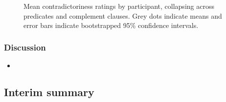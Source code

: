 \documentclass[11pt,fleqn]{article}
\newcommand{\6}{\mbox{$[\hspace*{-.6mm}[$}}
\newcommand{\9}{\mbox{$]\hspace*{-.6mm}]$}}
\begin{document}
\begin{figure}[h!]
\centering



\caption{Mean contradictoriness ratings by participant, collapsing across predicates and complement clauses. Grey dots indicate means and error bars indicate bootstrapped 95\% confidence intervals.}
\label{f-contradict-participant2}
\end{figure}

\subsubsection{Discussion}

\begin{itemize}

\item 

\end{itemize}

\subsection{Interim summary}
\end{document}
